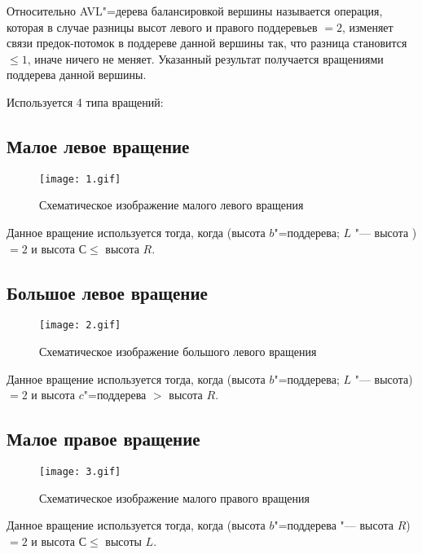 Относительно AVL"=дерева балансировкой вершины называется операция,
которая в случае разницы высот левого и правого поддеревьев $= 2$,
изменяет связи предок-потомок в поддереве данной вершины так,
что разница становится $ \leqslant 1$, иначе ничего не меняет.
Указанный результат получается вращениями поддерева данной вершины.

Используется 4 типа вращений:

\subsection*{Малое левое вращение}

\begin{figure}[ht]
    \texttt{[image: 1.gif]}
    
    \caption{Схематическое изображение малого левого вращения}    
\end{figure}

Данное вращение используется тогда,
когда (высота $b$"=поддерева; $L$ "--- высота )
$= 2$ и высота $С \leqslant$ высота $R$.

\subsection*{Большое левое вращение}

\begin{figure}[ht]
\texttt{[image: 2.gif]}

\caption{Схематическое изображение большого левого вращения}
\end{figure}

Данное вращение используется тогда,
когда (высота $b$"=поддерева; $L$ "--- высота)
$= 2$ и высота $c$"=поддерева $>$ высота $R$.

\subsection*{Малое правое вращение}

\begin{figure}[ht]
    \texttt{[image: 3.gif]}
    
    \caption{Схематическое изображение малого правого вращения}
\end{figure}

Данное вращение используется тогда,
когда (высота $b$"=поддерева "--- высота $R$)
$= 2$ и высота $С \leqslant $ высоты $L$.


